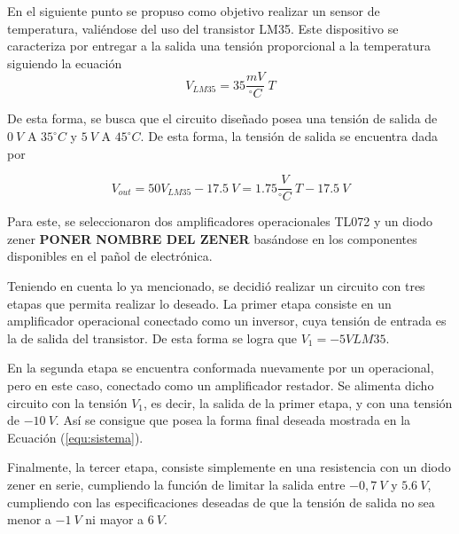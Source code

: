 \documentclass[a4paper]{article}
\begin{document}
En el siguiente punto se propuso como objetivo realizar un sensor de temperatura, valiéndose del uso del transistor LM35. Este dispositivo se caracteriza por entregar a la salida una tensión proporcional a la temperatura siguiendo la ecuación
\[
	V_{LM35} = 35 \frac{mV}{^{\circ}C} \ T
\]

De esta forma, se busca que el circuito diseñado posea una tensión de salida de $ 0 \ V $ A $ 35 ^{\circ}C $ y $ 5 \ V $ A $ 45 ^{\circ}C $. De esta forma, la tensión de salida se encuentra dada por 

\begin{equation}
	V_{out} = 50V_{LM35} - 17.5 \ V =  1.75 \frac{V}{^{\circ}C} \ T - 17.5 \ V
	\label{equ:sistema}
\end{equation}

Para este, se seleccionaron dos amplificadores operacionales TL072 y un diodo zener \textbf{PONER NOMBRE DEL ZENER} basándose en los componentes disponibles en el pañol de electrónica.

Teniendo en cuenta lo ya mencionado, se decidió realizar un circuito con tres etapas que permita realizar lo deseado.
La primer etapa consiste en un amplificador operacional conectado como un inversor, cuya tensión de entrada es la de salida del transistor. De esta forma se logra que $V_1 = -5 V{LM35}$.


En la segunda etapa se encuentra conformada nuevamente por un operacional, pero en este caso, conectado como un amplificador restador. Se alimenta dicho circuito con la tensión $V_1$, es decir, la salida de la primer etapa, y con una tensión de $- 10 \ V$. Así se consigue que posea la forma final deseada mostrada en la Ecuación (\ref{equ:sistema}).


Finalmente, la tercer etapa, consiste simplemente en una resistencia con un diodo zener en serie, cumpliendo la función de limitar la salida entre $-0,7 \ V$ y $5.6 \ V$, cumpliendo con las especificaciones deseadas de que la tensión de salida no sea menor a $-1 \ V$ ni mayor a $6 \ V$.
\end{document}
